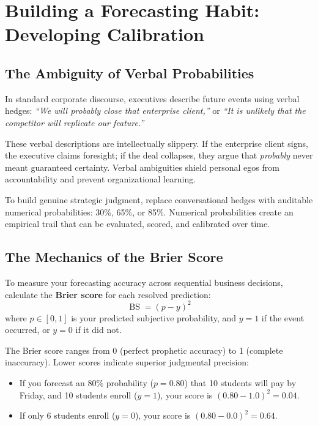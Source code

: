 \section{Building a Forecasting Habit: Developing Calibration}

\subsection{The Ambiguity of Verbal Probabilities}

In standard corporate discourse, executives describe future events using verbal hedges: \textit{``We will probably close that enterprise client,''} or \textit{``It is unlikely that the competitor will replicate our feature.''}

These verbal descriptions are intellectually slippery. If the enterprise client signs, the executive claims foresight; if the deal collapses, they argue that \textit{probably} never meant guaranteed certainty. Verbal ambiguities shield personal egos from accountability and prevent organizational learning.

To build genuine strategic judgment, replace conversational hedges with auditable numerical probabilities: 30\%, 65\%, or 85\%. Numerical probabilities create an empirical trail that can be evaluated, scored, and calibrated over time.

\subsection{The Mechanics of the Brier Score}

To measure your forecasting accuracy across sequential business decisions, calculate the \textbf{Brier score} for each resolved prediction:
\begin{equation}
\operatorname{BS} = (p - y)^2
\end{equation}
where $p \in [0, 1]$ is your predicted subjective probability, and $y = 1$ if the event occurred, or $y = 0$ if it did not.

The Brier score ranges from 0 (perfect prophetic accuracy) to 1 (complete inaccuracy). Lower scores indicate superior judgmental precision:
\begin{itemize}[leftmargin=10pt,itemsep=1pt,topsep=1pt]
  \item If you forecast an 80\% probability ($p = 0.80$) that 10 students will pay by Friday, and 10 students enroll ($y = 1$), your score is $(0.80 - 1.0)^2 = \mathbf{0.04}$.
  \item If only 6 students enroll ($y = 0$), your score is $(0.80 - 0.0)^2 = \mathbf{0.64}$.
\end{itemize}

